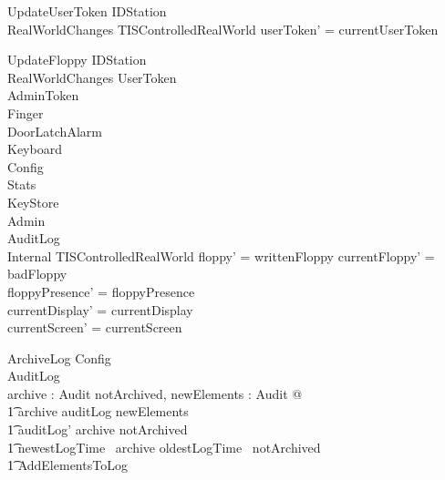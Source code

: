 \begin{schema}{UpdateUserToken}
	\Xi IDStation
\\	RealWorldChanges
\also
        \Xi TISControlledRealWorld
\where
	userToken' = currentUserToken
\end{schema}

\begin{schema}{UpdateFloppy}
        \Delta IDStation
\\      RealWorldChanges
\also
        \Xi UserToken
\\      \Xi AdminToken
\\      \Xi Finger
\\      \Xi DoorLatchAlarm
\\      \Xi Keyboard
\\      \Xi Config
\\      \Xi Stats
\\      \Xi KeyStore
\\      \Xi Admin      
\\      \Xi AuditLog
\\      \Xi Internal
\also
	\Xi TISControlledRealWorld
\where
	floppy' = writtenFloppy
\also
        currentFloppy' = badFloppy
\\      floppyPresence' = floppyPresence
\\      currentDisplay' = currentDisplay
\\      currentScreen' = currentScreen
\end{schema}

\begin{schema}{ArchiveLog}
        Config
\\      \Delta AuditLog
\\      archive : \finset Audit
\where
        \exists  notArchived,
        newElements : \finset Audit @
\\ \t1           archive \subseteq auditLog \cup newElements
\\ \t1          \land auditLog' \subseteq archive \cup notArchived
\\ \t1          \land newestLogTime~ archive \leq oldestLogTime~ notArchived 
\\ \t1          \land AddElementsToLog
\end{schema}

